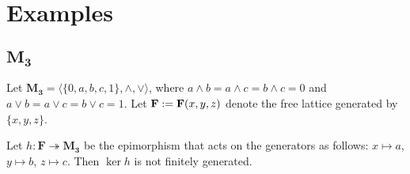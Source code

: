   \appendix

\section{Examples}

\subsection{$\mathbf{M_3}$}

Let $\mathbf{M_3} = \langle \{0, a, b, c, 1\}, \wedge, \vee\rangle$, where $a \wedge b = a \wedge c = b \wedge c = 0$ and $a \vee b = a \vee c = b \vee c = 1.$ Let $\mathbf{F} := \mathbf{F}(x, y, z)$ denote the free lattice generated by $\{x, y, z\}$.

\begin{proposition}
Let $h\colon \mathbf{F} \twoheadrightarrow \mathbf{M_3}$ be the epimorphism that acts on the generators as follows: $x\mapsto a$, $y\mapsto b$, $z\mapsto c.$ Then $\operatorname{ker} h$ is not finitely generated.
\end{proposition}
